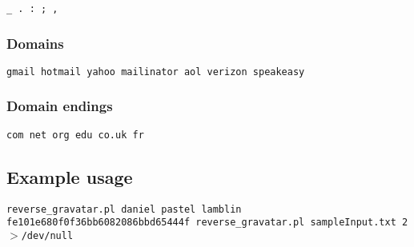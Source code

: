 \texttt{\_ . : ; ,}

\subsubsection*{Domains\label{Domains}}


\texttt{gmail hotmail yahoo mailinator aol verizon speakeasy}

\subsubsection*{Domain endings\label{Domain_endings}}


\texttt{com net org edu co.uk fr}

\subsection*{Example usage\label{Example_usage}}


\texttt{reverse\_gravatar.pl daniel pastel lamblin fe101e680f0f36bb6082086bbd65444f
reverse\_gravatar.pl sampleInput.txt 2$>$/dev/null}

